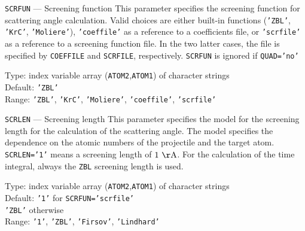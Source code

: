 \begin{keydescription}{\texttt{SCRFUN} --- Screening function}
%
  This parameter specifies the screening function for scattering angle
  calculation. Valid choices are either
  built-in functions (\texttt{'ZBL'}, \texttt{'KrC'}, \texttt{'Moliere'}),
  \texttt{'coeffile'} as a reference to a coefficients file, or 
  \texttt{'scrfile'} as a reference to a screening function file. In the two
  latter cases, the file is specified by \texttt{COEFFILE} and \texttt{SCRFILE},
  respectively. \texttt{SCRFUN} is ignored if \texttt{QUAD='no'}
  \begin{keytab}
    Type:    \> index variable array (\texttt{ATOM2},\texttt{ATOM1}) 
                of character strings \\ 
    Default: \> \texttt{'ZBL'} \\
    Range:   \> \texttt{'ZBL'}, \texttt{'KrC'}, \texttt{'Moliere'},
    			\texttt{'coeffile'}, \texttt{'scrfile'}
  \end{keytab}
\end{keydescription}

\begin{keydescription}{\texttt{SCRLEN} --- Screening length}
%
  This parameter specifies the model for the screening length for the
  calculation of the scattering angle. The model specifies the dependence 
  on the atomic numbers of the projectile and the target atom. 
  \texttt{SCRLEN='1'} means a screening length of $1~\rm\AA$. For the
  calculation of the time integral, always the \texttt{ZBL} screening
  length is used.
  \begin{keytab}
    Type:    \> index variable array (\texttt{ATOM2},\texttt{ATOM1}) 
                of character strings \\ 
    Default: \> \texttt{'1'} for \texttt{SCRFUN='scrfile'} \\
    		 \> \texttt{'ZBL'} otherwise \\
    Range:   \> \texttt{'1'}, \texttt{'ZBL'}, \texttt{'Firsov'}, \texttt{'Lindhard'}
  \end{keytab}
\end{keydescription}

